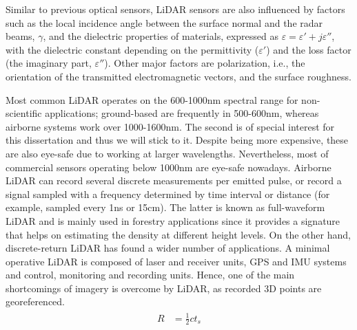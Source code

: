 Similar to previous optical sensors, LiDAR sensors are also influenced by factors such as the local incidence angle between the surface normal and the radar beams, $\gamma$, and the dielectric properties of materials, expressed as $\varepsilon = \varepsilon' + j\varepsilon''$, with the dielectric constant depending on the permittivity ($\varepsilon'$) and the loss factor (the imaginary part, $\varepsilon''$). Other major factors are polarization, i.e., the orientation of the transmitted electromagnetic vectors, and the surface roughness.

Most common LiDAR operates on the 600-1000\si{\nano\meter} spectral range for non-scientific applications; ground-based are frequently in 500-600\si{\nano\meter}, whereas airborne systems work over 1000-1600\si{\nano\meter}. The second is of special interest for this dissertation and thus we will stick to it. Despite being more expensive, these are also eye-safe due to working at larger wavelengths. Nevertheless, most of commercial sensors operating below 1000\si{\nano\meter} are eye-safe nowadays. Airborne LiDAR can record several discrete measurements per emitted pulse, or record a signal sampled with a frequency determined by time interval or distance (for example, sampled every 1\si{\nano\second} or 15\si{\centi\meter}). The latter is known as full-waveform LiDAR and is mainly used in forestry applications since it provides a signature that helps on estimating the density at different height levels. On the other hand, discrete-return LiDAR has found a wider number of applications. A minimal operative LiDAR is composed of laser and receiver units, GPS and IMU systems and control, monitoring and recording units. Hence, one of the main shortcomings of imagery is overcome by LiDAR, as recorded 3D points are georeferenced. 
\begin{gather}
    \label{eq:lidar_distance}
    \begin{aligned}
        R &= \frac{1}{2}ct_s
    \end{aligned}
\end{gather}

